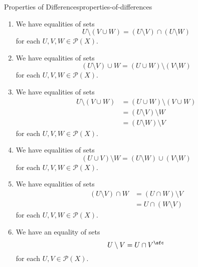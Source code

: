 \begin{proposition}{Properties of Differences}{properties-of-differences}
\begin{enumerate}
        \item\label{properties-of-differences-interaction-with-unions-1}We have equalities of sets
            \[%
                U\setminus(V\cup W)%
                =%
                (U\setminus V)\cap(U\setminus W)
            \]%
            for each $U,V,W\in\mathcal{P}(X)$.
        \item\label{properties-of-differences-interaction-with-unions-2}We have equalities of sets
            \[%
                (U\setminus V)\cup W%
                =%
                (U\cup W)\setminus(V\setminus W)%
            \]%
            for each $U,V,W\in\mathcal{P}(X)$.
        \item\label{properties-of-differences-interaction-with-unions-3}We have equalities of sets
            \begin{align*}
                U\setminus(V\cup W) &= (U\cup W)\setminus(V\cup W)\\
                                    &= (U\setminus V)\setminus W\\
                                    &= (U\setminus W)\setminus V
            \end{align*}
            for each $U,V,W\in\mathcal{P}(X)$.
        \item\label{properties-of-differences-interaction-with-unions-4}We have equalities of sets
            \[%
                (U\cup V)\setminus W%
                =%
                (U\setminus W)\cup(V\setminus W)%
            \]%
            for each $U,V,W\in\mathcal{P}(X)$.
        \item\label{properties-of-differences-interaction-with-intersections}We have equalities of sets
            \begin{align*}
                (U\setminus V)\cap W &= (U\cap W)\setminus V\\
                                     &= U\cap(W\setminus V)
            \end{align*}
            for each $U,V,W\in\mathcal{P}(X)$.
        \item\label{properties-of-differences-interaction-with-complements}We have an equality of sets
            \[
                U\setminus V%
                =%
                U\cap V^{\sfc}%
            \]%
            for each $U,V\in\mathcal{P}(X)$.

\end{enumerate}
\end{proposition}
